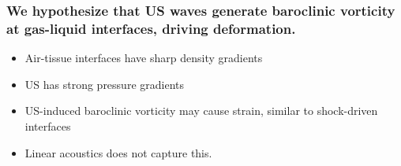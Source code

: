 \begin{frame} \frametitle{We hypothesize that US waves generate baroclinic vorticity at gas-liquid interfaces, driving deformation.}%
  \vfill 
  \begin{minipage}{\textwidth}
    \begin{minipage}{0.5\textwidth}
      {\footnotesize
        \begin{itemize}%
        \item Air-tissue interfaces have sharp density gradients%
          \vspace*{6pt}%
        \item US has strong pressure gradients%
          \vspace*{6pt}%
        \item US-induced baroclinic vorticity may cause strain, similar to shock-driven interfaces%
          \vspace*{6pt}%
        \item Linear acoustics does not capture this.
        \end{itemize}
      }
    \end{minipage}
    \begin{minipage}{0.5\textwidth}
      \begin{figure}

\end{figure}
\end{minipage}
\end{minipage}
\end{frame}
